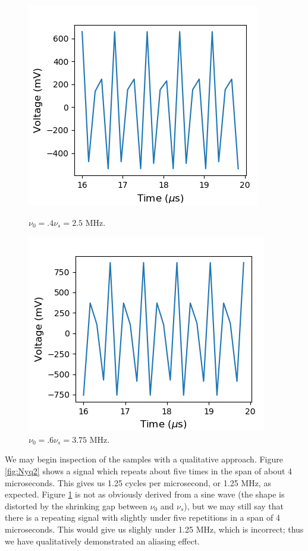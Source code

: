 \documentclass[a4paper]{article}
\begin{document}
\begin{figure}
\centering
\begin{minipage}{.5\textwidth}
	\centering
	\includegraphics[width=.8\linewidth]{5-2/trial4}
	\caption{$\nu_0 = .4 \nu_s = 2.5$ MHz.}
	\label{fig:Nyq4}
\end{minipage}%
\begin{minipage}{.5\textwidth}
	\centering
	\includegraphics[width=.8\linewidth]{5-2/trial6}
	\caption{$\nu_0 = .6 \nu_s = 3.75$ MHz.}
	\label{fig:Nyq6}
\end{minipage}
\end{figure}
	
\quad We may begin inspection of the samples with a qualitative approach. Figure \ref{fig:Nyq2} shows a signal which repeats about five times in the span of about 4 microseconds. This gives us 1.25 cycles per microsecond, or 1.25 MHz, as expected. Figure \ref{fig:Nyq6} is not as obviously derived from a sine wave (the shape is distorted by the shrinking gap between $\nu_0$ and $\nu_s$), but we may still say that there is a repeating signal with slightly under five repetitions in a span of 4 microseconds. This would give us slighly under 1.25 MHz, which is incorrect; thus we have qualitatively demonstrated an aliasing effect.
\end{document}
